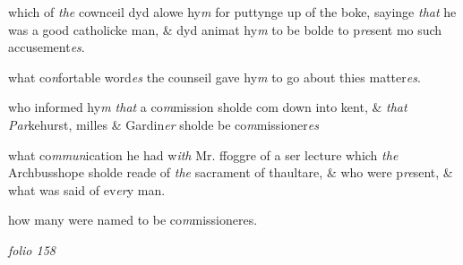 \documentclass[12pt, a4paper]{book}
\begin{document}
			

		\ifthenelse{\isodd{\thepage}}
		{\reversemarginpar}
		{\normalmarginpar}
		 which of \textit{the} cownceil dyd alowe hy\textit{m} for puttynge up
 of the boke, sayinge \textit{that} he was a good catholicke man,
 \& dyd animat hy\textit{m} to be bolde to p\textit{re}sent mo such
 accusement\textit{es}.
 



			

		\ifthenelse{\isodd{\thepage}}
		{\reversemarginpar}
		{\normalmarginpar}
		 what co\textit{n}fortable word\textit{es} the counseil gave hy\textit{m} to go about
 thies matter\textit{es}.
 



			

		\ifthenelse{\isodd{\thepage}}
		{\reversemarginpar}
		{\normalmarginpar}
		 who informed hy\textit{m that} a co\textit{m}mission sholde com down into
 kent, \& \textit{that}
	\textit{Par}kehurst, milles \& Gardin\textit{er} sholde be co\textit{m}missioner\textit{es}
 



			

		\ifthenelse{\isodd{\thepage}}
		{\reversemarginpar}
		{\normalmarginpar}
		 what co\textit{mmun}ication he had w\textit{ith} Mr. ffoggre of a ser lecture which
 \textit{the} Archbusshope sholde reade of \textit{the} sacrament of thaultare,
 \& who were p\textit{re}sent, \& what was said of ev\textit{er}y man.
 



				\marginpar[\vspace{0.5cm}{\textcolor{Gray}{11}}]{}
			

		\ifthenelse{\isodd{\thepage}}
		{\reversemarginpar}
		{\normalmarginpar}
		 how many were named to be co\textit{m}missioneres.

\dotfill
					

\textit{folio 158}

         \vspace{4cm}
         
\end{document}
